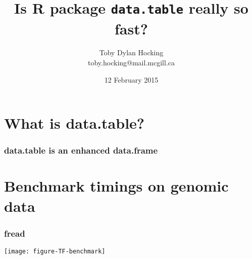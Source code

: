 \documentclass{beamer}
\begin{document}
\title{Is R package \texttt{data.table} really so fast?} 

\author{
  Toby Dylan Hocking\\
  toby.hocking@mail.mcgill.ca}

\date{12 February 2015}

\maketitle

\section{What is data.table?}

\begin{frame}
  \frametitle{data.table is an enhanced data.frame}
\end{frame}

\section{Benchmark timings on genomic data}

\begin{frame}
  \frametitle{fread}
  \texttt{[image: figure-TF-benchmark]}
\end{frame}
\end{document}
